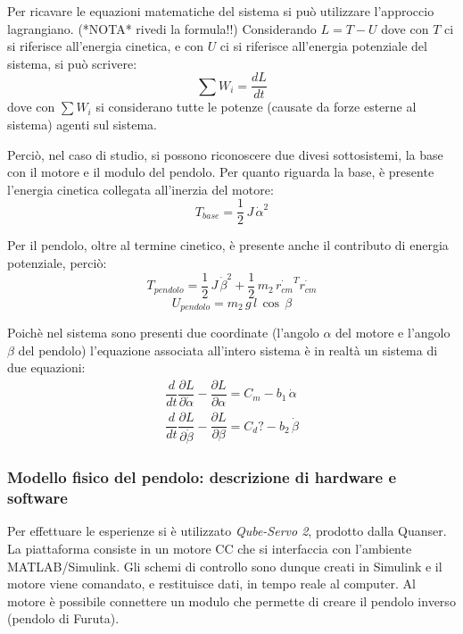 \documentclass[11pt]{article}
\begin{document}
Per ricavare le equazioni matematiche del sistema si può utilizzare l'approccio lagrangiano. (*NOTA* rivedi la formula!!)
Considerando $L = T - U$ dove con $T$ ci si riferisce all'energia cinetica, e con $U$ ci si riferisce all'energia potenziale del sistema, si può scrivere:
\begin{equation}
	\sum W_i = \dfrac{dL}{dt}
\end{equation}
dove con $\sum W_i$ si considerano tutte le potenze (causate da forze esterne al sistema) agenti sul sistema.


Perciò, nel caso di studio, si possono riconoscere due divesi sottosistemi, la base con il motore e il modulo del pendolo.
Per quanto riguarda la base, è presente l'energia cinetica collegata all'inerzia del motore:
\begin{equation}
    T_{base} = \dfrac{1}{2} \, J \, \dot{\alpha}^2
\end{equation}

Per il pendolo, oltre al termine cinetico, è presente anche il contributo di energia potenziale, perciò:
\begin{equation}
    T_{pendolo} = \dfrac{1}{2} \, J \, \dot{\beta}^2 + \dfrac{1}{2} \, m_2 \, \dot{r_{cm}}^T\dot{r_{cm}}
\end{equation}
\begin{equation}
    U_{pendolo} = m_2 \, g\, l\, \cos\,\beta
\end{equation}

Poichè nel sistema sono presenti due coordinate (l'angolo $\alpha$ del motore e l'angolo $\beta$ del pendolo) l'equazione associata all'intero sistema è in realtà un sistema di due equazioni:
\begin{gather}
	\dfrac{d}{dt}\dfrac{\partial L}{\partial \dot{\alpha}} - \dfrac{\partial L}{\partial \alpha} = C_m - b_1 \, \dot{\alpha} \\
	\dfrac{d}{dt}\dfrac{\partial L}{\partial \dot{\beta}} - \dfrac{\partial L}{\partial \beta} = C_d? - b_2 \, \dot{\beta}
\end{gather}




\subsubsection*{Modello fisico del pendolo: descrizione di hardware e software}
Per effettuare le esperienze si è utilizzato \textit{Qube-Servo 2}, prodotto dalla Quanser. La piattaforma consiste in un motore CC che si interfaccia con l'ambiente MATLAB/Simulink. Gli schemi di controllo sono dunque creati in Simulink e il motore viene comandato, e restituisce dati, in tempo reale al computer.
Al motore è possibile connettere un modulo che permette di creare il pendolo inverso (pendolo di Furuta).
\end{document}
